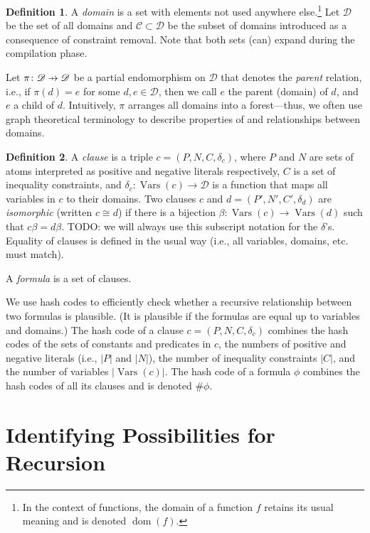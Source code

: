 \documentclass{article}
\theoremstyle{definition}
\newtheorem{definition}{Definition}
\newcommand\pfun{\mathrel{\ooalign{\hfil$\mapstochar\mkern5mu$\hfil\cr$\to$\cr}}}
\DeclareMathOperator{\dom}{dom}
\DeclareMathOperator{\Vars}{Vars}
\begin{document}
\begin{definition}
  A \emph{domain} is a set with elements not used anywhere else.\footnote{In the context of functions, the domain of a function $f$ retains its usual meaning and is denoted $\dom(f)$.} Let $\mathscr{D}$ be the set of all domains and $\mathscr{C} \subset \mathscr{D}$ be the subset of domains introduced as a consequence of constraint removal. Note that both sets (can) expand during the compilation phase.

Let $\pi\colon \mathscr{D} \pfun \mathscr{D}$ be a partial endomorphism on $\mathscr{D}$ that denotes the \emph{parent} relation, i.e., if $\pi(d) = e$ for some $d, e \in \mathscr{D}$, then we call $e$ the parent (domain) of $d$, and $e$ a child of $d$. Intuitively, $\pi$ arranges all domains into a forest---thus, we often use graph theoretical terminology to describe properties of and relationships between domains.
\end{definition}

\begin{definition}
  A \emph{clause} is a triple $c = (P, N, C, \delta_c)$, where $P$ and $N$ are sets of atoms interpreted as positive and negative literals respectively, $C$ is a set of inequality constraints, and $\delta_c\colon \Vars(c) \to \mathscr{D}$ is a function that maps all variables in $c$ to their domains. Two clauses $c$ and $d = (P', N', C', \delta_d)$ are \emph{isomorphic} (written $c \cong d$) if there is a bijection $\beta\colon \Vars(c) \to \Vars(d)$ such that $c\beta = d\beta$. TODO: we will always use this subscript notation for the $\delta$'s. Equality of clauses is defined in the usual way (i.e., all variables, domains, etc. must match).
\end{definition}

A \emph{formula} is a set of clauses.

We use hash codes to efficiently check whether a recursive relationship between two formulas is plausible. (It is plausible if the formulas are equal up to variables and domains.) The hash code of a clause $c = (P, N, C, \delta_c)$ combines the hash codes of the sets of constants and predicates in $c$, the numbers of positive and negative literals (i.e., $|P|$ and $|N|$), the number of inequality constraints $|C|$, and the number of variables $|\Vars(c)|$. The hash code of a formula $\phi$ combines the hash codes of all its clauses and is denoted $\#\phi$.

\section{Identifying Possibilities for Recursion}
\end{document}
